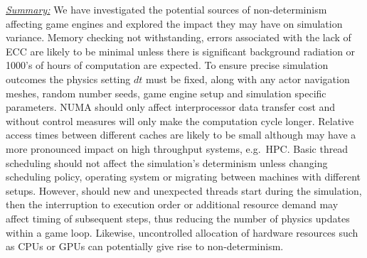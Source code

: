 \documentclass[letterpaper, 10 pt, journal, twoside]{IEEEtran}
\begin{document}
\noindent\underline{\textit{Summary:}}
We have investigated the potential sources of non-determinism affecting game engines 
and explored the impact they may have on simulation variance. 
%
%
Memory checking not withstanding, errors associated with the lack of ECC are likely to be minimal unless there is significant background radiation or 1000's of hours of computation are expected.
%
To ensure precise simulation outcomes the physics setting $dt$ must be fixed, along with any actor navigation meshes, random number seeds, game engine setup and simulation specific parameters.
%
NUMA should only affect interprocessor data transfer cost and without control measures will only make the computation cycle longer. Relative access times between different caches are likely to be small although may have a more pronounced impact on high throughput systems, e.g.\ HPC. 
%
Basic thread scheduling should not affect the simulation's determinism unless changing scheduling policy, operating system or migrating between machines with different setups. 
%
However, should new and unexpected threads start during the simulation, then the interruption to execution order or additional resource demand may affect timing of subsequent steps, thus reducing the number of physics updates within a game loop. Likewise, uncontrolled allocation of hardware resources such as CPUs or GPUs can potentially give rise to non-determinism. 
%
\end{document}
